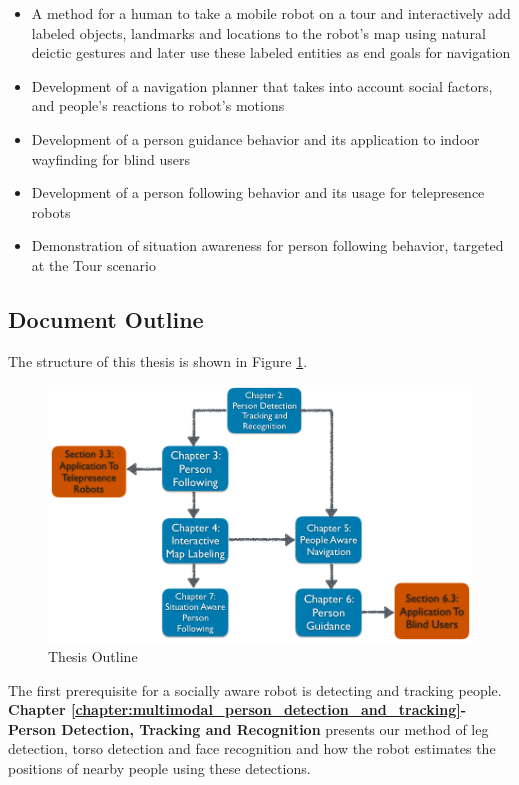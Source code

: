 \begin{itemize}
\item A method for a human to take a mobile robot on a tour and interactively add labeled objects, landmarks and locations to the robot's map using natural deictic gestures and later use these labeled entities as end goals for navigation
\item Development of a navigation planner that takes into account social factors, and people's reactions to robot's motions
\item Development of a person guidance behavior and its application to indoor wayfinding for blind users
\item Development of a person following behavior and its usage for telepresence robots
\item Demonstration of situation awareness for person following behavior, targeted at the Tour scenario
\end{itemize}


\subsection{Document Outline}

The structure of this thesis is shown in Figure \ref{fig:thesis_outline}.

\begin{figure}[ht!]
\centering
\includegraphics[width=1.0\textwidth]{pics/outline_new}
\caption{Thesis Outline}
\label{fig:thesis_outline}
\end{figure}

The first prerequisite for a socially aware robot is detecting and tracking people. \textbf{Chapter \ref{chapter:multimodal_person_detection_and_tracking}- Person Detection, Tracking and Recognition} presents our method of leg detection, torso detection and face recognition and how the robot estimates the positions of nearby people using these detections.

